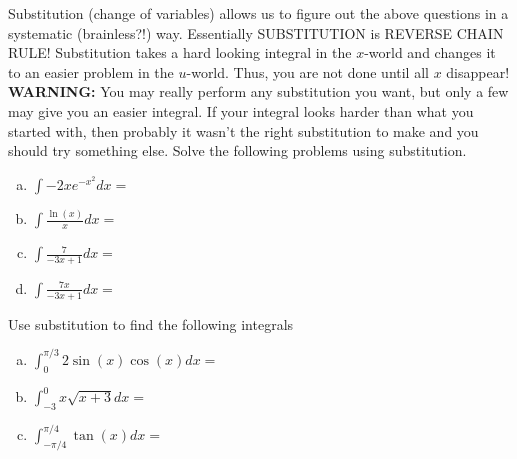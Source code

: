 \documentclass[answers]{exam}
\begin{document}
\begin{questions}
\question Substitution (change of variables) allows us to figure out the above questions in a systematic (brainless?!) way. Essentially SUBSTITUTION is REVERSE CHAIN RULE! Substitution takes a hard looking integral in the $x$-world and changes it to an easier problem in the $u$-world. Thus, you are not done until all $x$ disappear! \textbf{WARNING:} You may really perform any substitution you want, but only a few may give you an easier integral. If your integral looks harder than what you started with, then probably it wasn\rq{}t the right substitution to make and you should try something else. Solve the following problems using substitution.

\begin{enumerate}[(a)]
\item $\displaystyle \int -2xe^{-x^2} dx = $

\hfill \break
\hfill \break
\hfill \break


\item $\displaystyle  \int \frac{\ln(x)}{x} dx =$

\hfill \break
\hfill \break
\hfill \break

\item $\displaystyle  \int \frac{7}{-3x+1} dx =$

\hfill \break
\hfill \break
\hfill \break
\hfill \break


\item $\displaystyle  \int \frac{7x}{-3x+1} dx =$

\hfill \break
\hfill \break
\hfill \break
\hfill \break

\end{enumerate}

\question Use substitution to find the following  integrals
\begin{enumerate}[(a)]
	
	\item $\displaystyle \int_0^{\pi/3} 2\sin(x)\cos(x)dx = $ 
	
	\hfill \break
	\hfill \break
	\hfill \break
	\hfill \break
	\hfill \break
	\hfill \break
	
	\item $\displaystyle \int_{-3}^0 x\sqrt{x+3} dx =$ 
	
	\hfill \break
	\hfill \break
	\hfill \break
	\hfill \break
	\hfill \break
	\hfill \break
	
	\item $\displaystyle \int_{-\pi/4}^{\pi/4} \tan(x) dx =$ 
	
	\hfill \break
	\hfill \break
	\hfill \break
	\hfill \break
	\hfill \break
	\hfill \break
	\hfill \break
	\hfill \break
		

\end{enumerate}
\end{questions}
\end{document}
